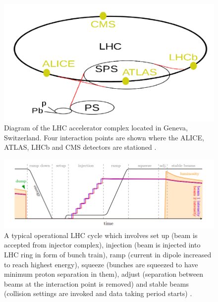 \begin{figure}[H]
  \centering
  \includegraphics[width=0.8\columnwidth]{./LHCcomplex.png}
  \caption{\onehalfspacing Diagram of the LHC accelerator complex located in Geneva, Switzerland. Four interaction points are shown where the ALICE, ATLAS, LHCb and CMS detectors are stationed \cite{Mobs:2684277}.}
  \label{fig:LHC}
\end{figure}


\begin{figure}[H]
  \centering
  \includegraphics[width=1 \columnwidth]{./lhcfill.png}
  \caption{ \onehalfspacing A typical operational LHC cycle which involves set up (beam is accepted from injector complex), injection (beam is injected into LHC ring in form of bunch train), ramp (current in dipole increased to reach highest energy), squeeze (bunches are squeezed to have minimum proton separation in them), adjust (separation between beams at the interaction point is removed) and stable beams (collision settings are invoked and data taking period starts) \cite{fill}.}
  \label{fig:LHCPlans}
\end{figure}

